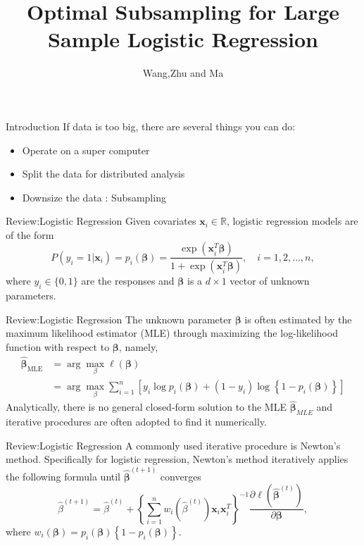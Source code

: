 \documentclass[12pt]{beamer}
\author{Wang,Zhu and Ma}
\title{Optimal Subsampling for Large Sample Logistic Regression}
\begin{document}
\begin{frame}
\titlepage
\end{frame}


\begin{frame}{Introduction}
If data is too big, there are several things you can do:
\begin{itemize}
\item Operate on a super computer 
\item Split the data for distributed analysis
\item Downsize the data : Subsampling
\end{itemize}
\end{frame}


\begin{frame}{Review:Logistic Regression}
Given covariates $\mathbf{x}_i\in \mathbb{R}$, logistic regression models are of the form
$$
P\left(y_{i}=1 | \mathbf{x}_{i}\right)=p_{i}(\boldsymbol{\beta})=\frac{\exp \left(\mathbf{x}_{i}^{T} \boldsymbol{\beta}\right)}{1+\exp \left(\mathbf{x}_{i}^{T} \boldsymbol{\beta}\right)}, \quad i=1,2, \ldots, n,
$$
where $y_i \in \{0,1\}$ are the responses and $\mathbf{\beta}$ is a $d\times 1$ vector of unknown parameters. 
\end{frame}

\begin{frame}{Review:Logistic Regression}
The unknown parameter $\mathbf{\beta}$ is often estimated by the
maximum likelihood estimator (MLE) through maximizing the
log-likelihood function with respect to $\mathbf{\beta}$, namely,
$$
\begin{aligned}
\hat{\boldsymbol{\beta}}_{\mathrm{MLE}} &=\arg \max _{\beta} \ell(\boldsymbol{\beta}) \\
&=\arg \max _{\beta} \sum_{i=1}^{n}\left[y_{i} \log p_{i}(\boldsymbol{\beta})+\left(1-y_{i}\right) \log \left\{1-p_{i}(\boldsymbol{\beta})\right\}\right]
\end{aligned}
$$
Analytically, there is no general closed-form solution to the
MLE $\hat{\mathbf{\beta}}_{MLE}$ and iterative procedures are often adopted to find it numerically.
\end{frame}


\begin{frame}{Review:Logistic Regression}
A commonly used iterative procedure is Newton’s
method. Specifically for logistic regression, Newton’s method
iteratively applies the following formula until $\hat{\mathbf{\beta}}^{(t+1)}$ converges
$$
\hat{\beta}^{(t+1)}=\hat{\beta}^{(t)}+\left\{\sum_{i=1}^{n} w_{i}\left(\hat{\beta}^{(t)}\right) \mathbf{x}_{i} \mathbf{x}_{i}^{T}\right\}^{-1} \frac{\partial \ell\left(\hat{\boldsymbol{\beta}}^{(t)}\right)}{\partial \boldsymbol{\beta}},
$$
where $w_{i}(\boldsymbol{\beta})=p_{i}(\boldsymbol{\beta})\left\{1-p_{i}(\boldsymbol{\beta})\right\}$.
\end{frame}
\end{document}
